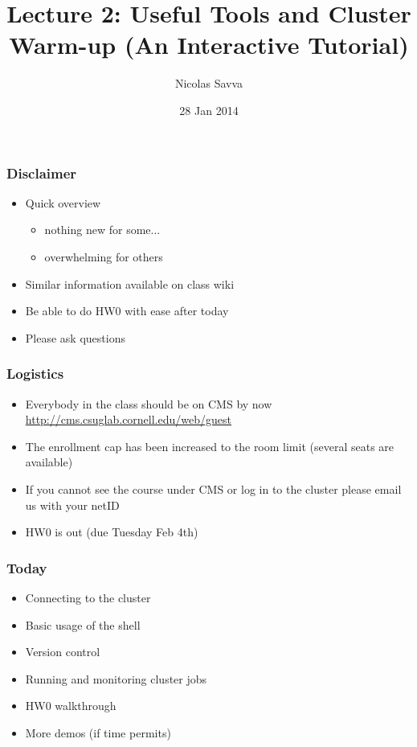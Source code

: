 \documentclass{beamer}
\title[CS 5220, Spring 2014]{Lecture 2: Useful Tools and Cluster Warm-up
(An Interactive Tutorial)}
\author[]{Nicolas Savva}
\date[]{28 Jan 2014}
\begin{document}
\begin{frame}
  \titlepage
\end{frame}

\begin{frame}
  \frametitle{Disclaimer}

  \begin{itemize}
  \item Quick overview
    \begin{itemize}
    \item nothing new for some...
    \item overwhelming for others
    \end{itemize}
  \item Similar information available on class wiki
  \item Be able to do HW0 with ease after today
  \item Please ask questions
  \end{itemize}
\end{frame}

\begin{frame}
  \frametitle{Logistics}

  \begin{itemize}
  \item Everybody in the class should be on CMS by now
  \url{http://cms.csuglab.cornell.edu/web/guest}
  \item The enrollment cap has been increased to the room limit
(several seats are available)
  \item If you cannot see the course under CMS or log in to the cluster please email us with your netID
  \item HW0 is out (due Tuesday Feb 4th)
  \end{itemize}
\end{frame}

\begin{frame}
  \frametitle{Today}

  \begin{itemize}
  \item Connecting to the cluster
  \item Basic usage of the shell
  \item Version control
  \item Running and monitoring cluster jobs
  \item HW0 walkthrough 
  \item More demos (if time permits)
  \end{itemize}
\end{frame}
\end{document}
